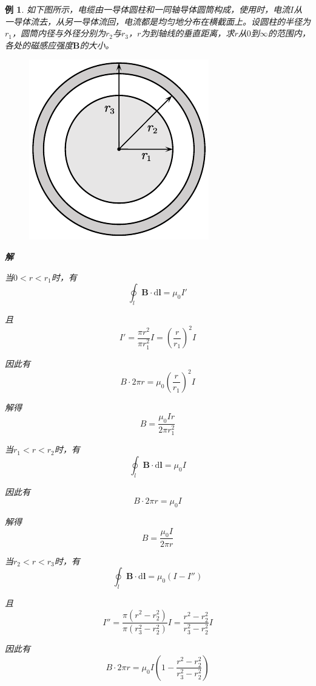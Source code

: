 \documentclass[12pt, a4paper, twoside]{ctexbook}
\newtheorem{example}[theorem]{例}
\begin{document}
\begin{example}
    如下图所示，电缆由一导体圆柱和一同轴导体圆筒构成，使用时，电流$I$从一导体流去，从另一导体流回，电流都是均匀地分布在横截面上。设圆柱的半径为$r_1$，圆筒内径与外径分别为$r_2$与$r_3$，$r$为到轴线的垂直距离，求$r$从$0$到$\infty$的范围内，各处的磁感应强度$\boldsymbol{B}$的大小。
    \begin{figure}[H]
        \centerline{\includegraphics[scale=0.92]{CH10EX05.pdf}}
    \end{figure}

    \noindent\textbf{解}

    当$0<r<r_1$时，有
    $$
    \oint_l\boldsymbol{B}\cdot\mathrm{d}\boldsymbol{l}=\mu_0 I'
    $$

    且
    $$
    I'=\frac{\pi r^2}{\pi r_1^2}I=\left(\frac{r}{r_1}\right)^2I
    $$
    
    因此有
    $$
    B\cdot 2\pi r=\mu_0\left(\frac{r}{r_1}\right)^2I
    $$

    解得
    $$
    B=\frac{\mu_0 I r}{2\pi r_1^2}
    $$

    当$r_1<r<r_2$时，有
    $$
    \oint_l\boldsymbol{B}\cdot\mathrm{d}\boldsymbol{l}=\mu_0 I
    $$
    
    因此有
    $$
    B\cdot 2\pi r=\mu_0 I
    $$

    解得
    $$
    B=\frac{\mu_0 I}{2\pi r}
    $$

    当$r_2<r<r_3$时，有
    $$
    \oint_l\boldsymbol{B}\cdot\mathrm{d}\boldsymbol{l}=\mu_0 \left(I-I''\right)
    $$

    且
    $$
    I''=\frac{\pi\left(r^2-r_2^2\right)}{\pi\left(r_3^2-r_2^2\right)}I=\frac{r^2-r_2^2}{r_3^2-r_2^2}I
    $$

    因此有
    $$
    B\cdot 2\pi r=\mu_0 I\left(1-\frac{r^2-r_2^2}{r_3^2-r_2^2}\right)
    $$


\end{example}
\end{document}
